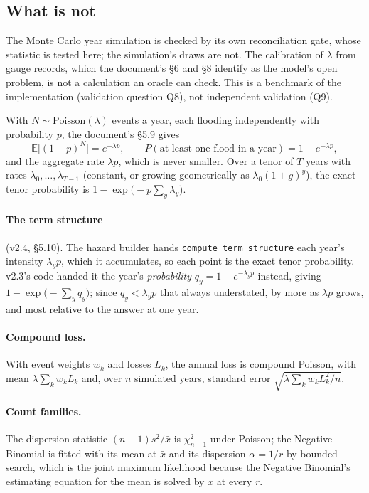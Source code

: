 \documentclass[11pt,a4paper]{article}
\begin{document}
\subsection{What is not}
The Monte Carlo year simulation is checked by its own reconciliation gate, whose
statistic is tested here; the simulation's draws are not. The calibration of
$\lambda$ from gauge records, which the document's \S6 and \S8 identify as the
model's open problem, is not a calculation an oracle can check. This is a
benchmark of the implementation (validation question Q8), not independent
validation (Q9).

\mkmframework

With $N\sim\text{Poisson}(\lambda)$ events a year, each flooding independently with
probability $p$, the document's \S5.9 gives
\begin{equation}
\mathbb{E}\bigl[(1-p)^N\bigr]=e^{-\lambda p},\qquad
P(\text{at least one flood in a year})=1-e^{-\lambda p},
\end{equation}
and the aggregate rate $\lambda p$, which is never smaller. Over a tenor of $T$
years with rates $\lambda_0,\dots,\lambda_{T-1}$ (constant, or growing
geometrically as $\lambda_0(1+g)^y$), the exact tenor probability is
$1-\exp\bigl(-p\sum_y\lambda_y\bigr)$.

\paragraph{The term structure} (v2.4, \S5.10). The hazard builder hands
\texttt{compute\_term\_structure} each year's intensity $\lambda_y p$, which it
accumulates, so each point is the exact tenor probability. v2.3's code handed it the
year's \emph{probability} $q_y=1-e^{-\lambda_y p}$ instead, giving
$1-\exp\bigl(-\sum_y q_y\bigr)$; since $q_y<\lambda_y p$ that always understated, by
more as $\lambda p$ grows, and most relative to the answer at one year.

\paragraph{Compound loss.} With event weights $w_k$ and losses $L_k$, the annual
loss is compound Poisson, with mean $\lambda\sum_k w_kL_k$ and, over $n$ simulated
years, standard error $\sqrt{\lambda\sum_k w_kL_k^2/n}$.

\paragraph{Count families.} The dispersion statistic $(n-1)s^2/\bar x$ is
$\chi^2_{n-1}$ under Poisson; the Negative Binomial is fitted with its mean at
$\bar x$ and its dispersion $\alpha=1/r$ by bounded search, which is the joint
maximum likelihood because the Negative Binomial's estimating equation for the mean
is solved by $\bar x$ at every $r$.
\end{document}
